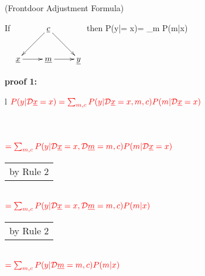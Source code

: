 \begin{claim} (Frontdoor
Adjustment Formula)
\label{cl-frontdoor-proof}

If
$
\xymatrix{
&{\rvc}\ar[ld]\ar[rd]
\\
\rvx\ar[r]&\rvm\ar[r]&\rvy
}$
then
\beq
P(y|\cald \rvx = x)=
\sum_m
P(m|x)
\eeq

\beq
{}
\eeq
\end{claim}

\proof


{\bf * proof 1:}
\\
\begin{longtable}{l}
$\color{red}
P(y|{\cal D}{\underline{x}}=x)=
\sum_{m,c}
P(y|{\cal D}{\underline{x}}=x, m, c)
P(m|{\cal D}{\underline{x}}=x)$
\\
\\
\xymatrix{\\=}
\\
\\
$\color{red}=
\sum_{m,c}
P(y|{\cal D}{\underline{x}}=x, {\cal D}{\underline{m}}=m, c)
P(m|{\cal D}{\underline{x}}=x)$
\\
\begin{tabular}{l}
\\
by Rule 2
\end{tabular}
\\
$\color{red}=
\sum_{m,c}
P(y|{\cal D}{\underline{x}}=x, {\cal D}{\underline{m}}=m, c)
P(m| x)$
\\
\begin{tabular}{l}
\\
by Rule 2
\end{tabular}
\\
$\color{red}=
\sum_{m,c}
P(y|{\cal D}{\underline{m}}=m, c)
P(m|x)$
\\

\end{longtable}

